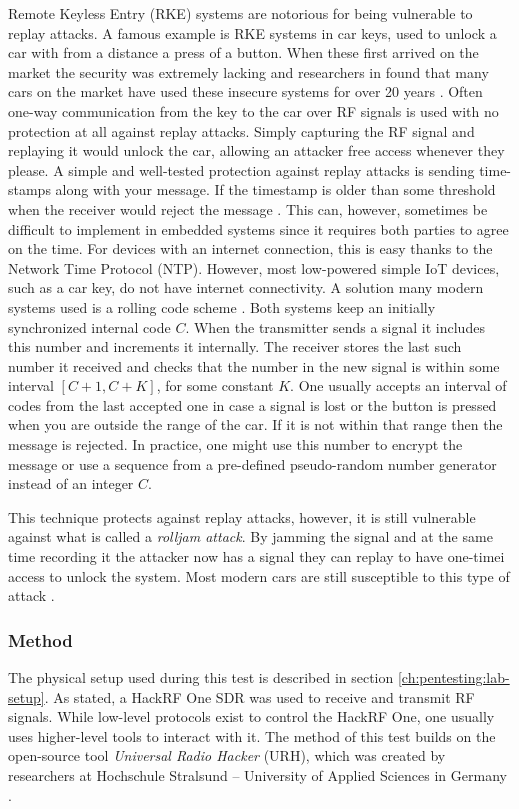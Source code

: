 Remote Keyless Entry (RKE) systems are notorious for being vulnerable to replay attacks. A famous example is RKE systems in car keys, used to unlock a car with from a distance a press of a button. When these first arrived on the market the security was extremely lacking and researchers in \citeyear{car-rke-systems} found that many cars on the market have used these insecure systems for over 20 years \cite{car-rke-systems}. Often one-way communication from the key to the car over RF signals is used with no protection at all against replay attacks. Simply capturing the RF signal and replaying it would unlock the car, allowing an attacker free access whenever they please. A simple and well-tested protection against replay attacks is sending time-stamps along with your message. If the timestamp is older than some threshold when the receiver would reject the message \cite{rke-replay}. This can, however, sometimes be difficult to implement in embedded systems since it requires both parties to agree on the time. For devices with an internet connection, this is easy thanks to the Network Time Protocol (NTP). However, most low-powered simple IoT devices, such as a car key, do not have internet connectivity. A solution many modern systems used is a rolling code scheme \cite{hacking-the-iot-talk}\cite{kamkar2015drive}. Both systems keep an initially synchronized internal code $C$. When the transmitter sends a signal it includes this number and increments it internally. The receiver stores the last such number it received and checks that the number in the new signal is within some interval $[C+1, C+K]$, for some constant $K$. One usually accepts an interval of codes from the last accepted one in case a signal is lost or the button is pressed when you are outside the range of the car. If it is not within that range then the message is rejected. In practice, one might use this number to encrypt the message or use a sequence from a pre-defined pseudo-random number generator instead of an integer $C$.

This technique protects against replay attacks, however, it is still vulnerable against what is called a \textit{rolljam attack}. By jamming the signal and at the same time recording it the attacker now has a signal they can replay to have one-timei access to unlock the system. Most modern cars are still susceptible to this type of attack \cite{hacking-the-iot-talk}\cite{kamkar2015drive}.

\subsubsection{Method} \label{ch:pentesting:replay:method}
The physical setup used during this test is described in section \ref{ch:pentesting:lab-setup}. As stated, a HackRF One SDR was used to receive and transmit RF signals. While low-level protocols exist to control the HackRF One, one usually uses higher-level tools to interact with it. The method of this test builds on the open-source tool \textit{Universal Radio Hacker} (URH), which was created by researchers at Hochschule Stralsund – University of Applied Sciences in Germany \cite{urh}.

